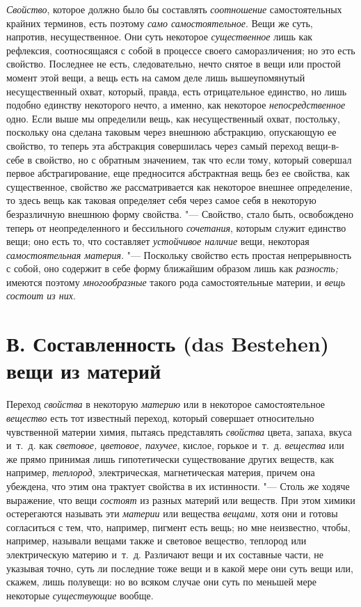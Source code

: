 {\em Свойство}, которое должно было бы составлять
{\em соотношение} самостоятельных крайних терминов,
есть поэтому {\em само самостоятельное}. Вещи же суть,
напротив, несущественное. Они суть некоторое
{\em существенное} лишь как рефлексия, соотносящаяся с
собой в процессе своего саморазличения; но это есть свойство. Последнее не
есть, следовательно, нечто снятое в вещи или простой момент этой вещи, а
вещь есть на самом деле лишь вышеупомянутый несущественный охват, который,
правда, есть отрицательное единство, но лишь подобно единству некоторого
нечто, а именно, как некоторое {\em непосредственное}
одно. Если выше мы определили вещь, как несущественный охват, постольку,
поскольку она сделана таковым через внешнюю абстракцию, опускающую ее
свойство, то теперь эта абстракция совершилась через самый переход
вещи-в-себе в свойство, но с обратным значением, так что если тому, который
совершал первое абстрагирование, еще предносится абстрактная вещь без ее
свойства, как существенное, свойство же рассматривается как некоторое
внешнее определение, то здесь вещь как таковая определяет себя через самое
себя в некоторую безразличную внешнюю форму свойства. "--- Свойство, стало
быть, освобождено теперь от неопределенного и бессильного
{\em сочетания}, которым служит единство вещи; оно есть
то, что составляет {\em устойчивое наличие} вещи,
некоторая {\em самостоятельная материя}. "--- Поскольку
свойство есть простая непрерывность с собой, оно содержит в себе форму
ближайшим образом лишь как {\em разность;} имеются
поэтому {\em многообразные} такого рода самостоятельные
материи, и {\em вещь состоит из них}.


\section[В. Составленность (das Bestehen) вещи из материй]
{В. Составленность (das Bestehen) вещи из материй}

Переход {\em свойства} в
некоторую {\em материю} или в некоторое самостоятельное
{\em вещество} есть тот известный переход, который
совершает относительно чувственной материи химия, пытаясь представлять
{\em свойства} цвета, запаха, вкуса и~т.~д. как
{\em световое, цветовое, пахучее}, кислое, горькое
и~т.~д. {\em вещества} или же прямо принимая лишь
гипотетически существование других веществ, как например,
{\em теплород}, электрическая, магнетическая материя,
причем она убеждена, что этим она трактует свойства в их истинности. "---
Столь же ходяче выражение, что вещи {\em состоят} из
разных материй или веществ. При этом химики остерегаются называть эти
{\em материи} или вещества
{\em вещами}, хотя они и готовы согласиться с тем, что,
например, пигмент есть вещь; но мне неизвестно, чтобы, например, называли
вещами также и световое вещество, теплород или электрическую материю
и~т.~д. Различают вещи и их составные части, не указывая точно, суть ли
последние тоже вещи и в какой мере они суть вещи или, скажем, лишь
полувещи: но во всяком случае они суть по меньшей мере некоторые
{\em существующие} вообще.

